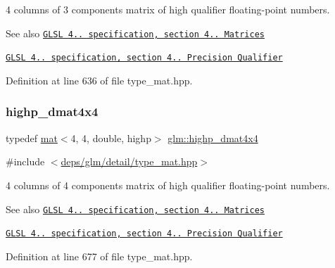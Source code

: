4 columns of 3 components matrix of high qualifier floating-\/point numbers.

\begin{DoxySeeAlso}{See also}
\href{http://www.opengl.org/registry/doc/GLSLangSpec.4.20.8.pdf}{\tt G\+L\+SL 4.. specification, section 4.. Matrices} 

\href{http://www.opengl.org/registry/doc/GLSLangSpec.4.20.8.pdf}{\tt G\+L\+SL 4.. specification, section 4.. Precision Qualifier} 
\end{DoxySeeAlso}


Definition at line 636 of file type\+\_\+mat.\+hpp.

\mbox{\label{group__core__precision_gad3df38df8c4f7ef9b38f03581ff60142}} 
\subsubsection{\texorpdfstring{highp\+\_\+dmat4x4}{highp\_dmat4x4}}
{\footnotesize\ttfamily typedef \hyperlink{structglm_1_1mat}{mat}$<$4, 4, double, highp$>$ \hyperlink{group__core__precision_gad3df38df8c4f7ef9b38f03581ff60142}{glm\+::highp\+\_\+dmat4x4}}



{\ttfamily \#include $<$\hyperlink{type__mat_8hpp}{deps/glm/detail/type\+\_\+mat.\+hpp}$>$}

4 columns of 4 components matrix of high qualifier floating-\/point numbers.

\begin{DoxySeeAlso}{See also}
\href{http://www.opengl.org/registry/doc/GLSLangSpec.4.20.8.pdf}{\tt G\+L\+SL 4.. specification, section 4.. Matrices} 

\href{http://www.opengl.org/registry/doc/GLSLangSpec.4.20.8.pdf}{\tt G\+L\+SL 4.. specification, section 4.. Precision Qualifier} 
\end{DoxySeeAlso}


Definition at line 677 of file type\+\_\+mat.\+hpp.

\mbox{\label{group__core__precision_gadec51e8e57b72d8fc95e87f18d1ad4dd}} 
